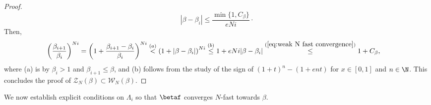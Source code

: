 \begin{proof}
	\begin{equation}\label{eq:weak N fast convergence}
		|\beta - \beta_i| \leq \frac{\min\{1,C_\beta\}}{eNi}\cdot
	\end{equation}
	Then,
	\begin{align}
		\left(\frac{\beta_{i+1}}{\beta_{i}}\right)^{Ni} &= \left(1 + \frac{\beta_{i+1} - \beta_i }{\beta_{i}}\right)^{Ni} \overset{(a)}{<}  \left(1 + |\beta - \beta_i|\right)^{Ni}  \overset{(b)}{\leq} 1 + eNi |\beta - \beta_i| \overset{(\ref{eq:weak N fast convergence})}{\leq} 1 + C_\beta,
	\end{align}
	where (a) is by $\beta_i > 1$ and $\beta_{i+1} \leq \beta$, and (b) follows from the study of the sign of $(1+t)^n - (1 + ent)$ for $x \in [0,1]$ and $n \in \N$. This concludes the proof of $\mathcal Z_N(\beta) \subset \mathcal W_N(\beta)$.
\end{proof}
We now establish explicit conditions on $\Lambda_i$ so that $\betaf$ converges $N$-fast towards $\beta$.

